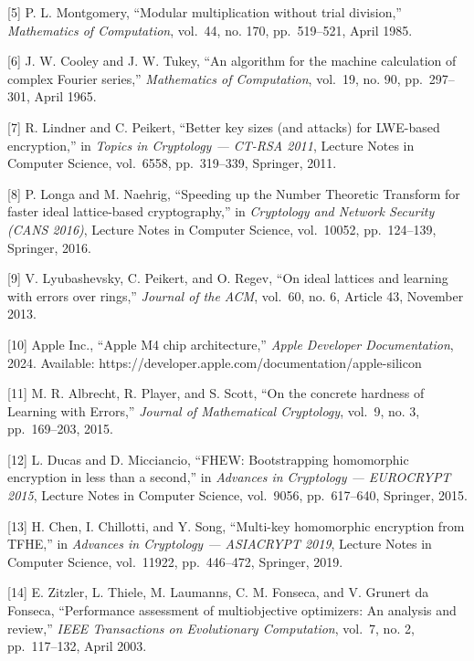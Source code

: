 [5] P. L. Montgomery, ``Modular multiplication without trial division,'' \emph{Mathematics of Computation}, vol.~44, no. 170, pp.~519--521, April 1985.

[6] J. W. Cooley and J. W. Tukey, ``An algorithm for the machine calculation of complex Fourier series,'' \emph{Mathematics of Computation}, vol.~19, no. 90, pp.~297--301, April 1965.

[7] R. Lindner and C. Peikert, ``Better key sizes (and attacks) for LWE-based encryption,'' in \emph{Topics in Cryptology --- CT-RSA 2011}, Lecture Notes in Computer Science, vol.~6558, pp.~319--339, Springer, 2011.

[8] P. Longa and M. Naehrig, ``Speeding up the Number Theoretic Transform for faster ideal lattice-based cryptography,'' in \emph{Cryptology and Network Security (CANS 2016)}, Lecture Notes in Computer Science, vol.~10052, pp.~124--139, Springer, 2016.

[9] V. Lyubashevsky, C. Peikert, and O. Regev, ``On ideal lattices and learning with errors over rings,'' \emph{Journal of the ACM}, vol.~60, no. 6, Article 43, November 2013.

[10] Apple Inc., ``Apple M4 chip architecture,'' \emph{Apple Developer Documentation}, 2024. Available: https://developer.apple.com/documentation/apple-silicon

[11] M. R. Albrecht, R. Player, and S. Scott, ``On the concrete hardness of Learning with Errors,'' \emph{Journal of Mathematical Cryptology}, vol.~9, no. 3, pp.~169--203, 2015.

[12] L. Ducas and D. Micciancio, ``FHEW: Bootstrapping homomorphic encryption in less than a second,'' in \emph{Advances in Cryptology --- EUROCRYPT 2015}, Lecture Notes in Computer Science, vol.~9056, pp.~617--640, Springer, 2015.

[13] H. Chen, I. Chillotti, and Y. Song, ``Multi-key homomorphic encryption from TFHE,'' in \emph{Advances in Cryptology --- ASIACRYPT 2019}, Lecture Notes in Computer Science, vol.~11922, pp.~446--472, Springer, 2019.

[14] E. Zitzler, L. Thiele, M. Laumanns, C. M. Fonseca, and V. Grunert da Fonseca, ``Performance assessment of multiobjective optimizers: An analysis and review,'' \emph{IEEE Transactions on Evolutionary Computation}, vol.~7, no. 2, pp.~117--132, April 2003.
